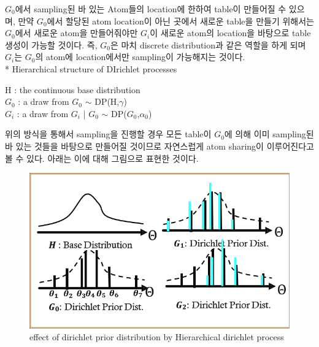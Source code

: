 \documentclass[a4paper]{oblivoir}
\begin{document}
$G_{0}$에서 sampling된 바 있는 Atom들의 location에 한하여 table이 만들어질 수 있으며, 만약 $G_{0}$에서 할당된 atom location이 아닌 곳에서 새로운 table을 만들기 위해서는 $G_{0}$에서 새로운 atom을 만들어줘야만 $G_{i}$이 새로운 atom의 location을 바탕으로 table 생성이 가능할 것이다. 즉, $G_{0}$은 마치 discrete distribution과 같은 역할을 하게 되며 $G_{i}$는 $G_{0}$의 atom에 location에서만 sampling이 가능해지는 것이다. \\

* Hierarchical structure of DIrichlet processes
\begin{center}
    H : the continuous base distribution\\
    $G_{0}$ : a draw from $G_{0}$ $\sim$ DP(H,$\gamma$)\\
    $G_{i}$ : a draw from $G_{i}$ | $G_{0}$ $\sim$ DP($G_{0}$,$\alpha_{0}$)\\
\end{center}
위의 방식을 통해서 sampling을 진행할 경우 모든 table이 $G_{0}$에 의해 이미 sampling된 바 있는 것들을 바탕으로 만들어질 것이므로 자연스럽게 atom sharing이 이루어진다고 볼 수 있다. 아래는 이에 대해 그림으로 표현한 것이다.
\begin{figure}[ht] \centering 
\begin{center}
\includegraphics[scale=0.6]{fig13_14.png} 
\caption{effect of dirichlet prior distribution by Hierarchical dirichlet process}
\label{fig:13-16}
\end{center}
\end{figure}
\end{document}
